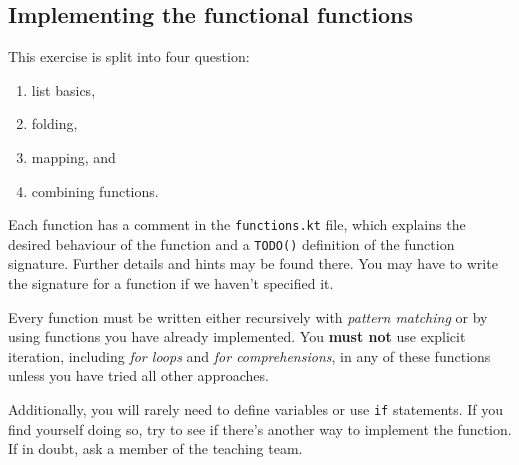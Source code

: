 \documentclass[12pt,a4paper]{exam}
\begin{document}
\subsection*{Implementing the functional functions}

This exercise is split into four question: 
\begin{enumerate}
\item list basics, 
\item folding, 
\item mapping, and 
\item combining functions. 
\end{enumerate} 
Each function has a comment in the \verb!functions.kt! file, which explains the desired behaviour 
of the function and a \verb!TODO()! definition of the function signature. 
Further details and hints may be found there. 
You may have to write the signature for a function if we haven't specified it.

Every function must be written either recursively with \emph{pattern matching} or by using 
functions you have already implemented.
You \textbf{must not} use explicit iteration, including \emph{for loops} and \emph{for comprehensions}, 
in any of these functions unless you have tried all other approaches.

Additionally, you will rarely need to define variables or use \verb!if! statements. 
If you find yourself doing so, try to see if there’s another way to implement the function. 
If in doubt, ask a member of the teaching team.
\end{document}
